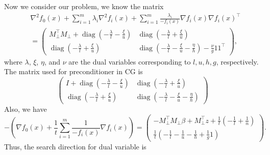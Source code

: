 \documentclass{article}
\begin{document}
Now we consider our problem, we know the matrix
\begin{equation}
    \begin{aligned}
        &\nabla^2 f_0(x)+\sum_{i=1}^m \lambda_i \nabla^2 f_i(x)+\sum_{i=1}^m \frac{\lambda_i}{-f_i(x)} \nabla f_i(x) \nabla f_i(x)^{\top}\\
        &=\left(\begin{array}{ll}
M_{\perp}^{\top} M_{\perp}+\operatorname{diag}\left(-\frac{\lambda}{l}-\frac{\xi}{u}\right) & \operatorname{diag}\left(-\frac{\lambda}{l}+\frac{\xi}{u}\right) \\
\operatorname{diag}\left(-\frac{\lambda}{l}+\frac{\xi}{u}\right) & \operatorname{diag}\left(-\frac{\lambda}{l}-\frac{\xi}{u}-\frac{\eta}{h}\right)-\frac{\nu}{g} 11^{\top}
\end{array}\right),
    \end{aligned}
\end{equation}
where $\lambda$, $\xi$, $\eta$, and $\nu$
 are the dual variables corresponding to $l, u, h, g$, respectively. The matrix used for preconditioner in CG is
 \begin{equation}
     \left(\begin{array}{ll}
I+\operatorname{diag}\left(-\frac{\lambda}{l}-\frac{\xi}{u}\right) & \operatorname{diag}\left(-\frac{\lambda}{l}+\frac{\xi}{u}\right) \\
\operatorname{diag}\left(-\frac{\lambda}{l}+\frac{\xi}{u}\right) & \operatorname{diag}\left(-\frac{\lambda}{l}-\frac{\xi}{u}-\frac{\eta}{h}\right)
\end{array}\right)
 \end{equation}
 Also, we have
 \begin{equation}
     -\left(\nabla f_0(x)+\frac{1}{t} \sum_{i=1}^m \frac{1}{-f_i(x)} \nabla f_i(x)\right)=\left(\begin{array}{c}
-M_{\perp}^{\top} M_{\perp} \beta+M_{\perp}^{\top} z+\frac{1}{t}\left(-\frac{1}{l}+\frac{1}{n}\right) \\
\frac{1}{t}\left(-\frac{1}{l}-\frac{1}{u}-\frac{1}{h}+\frac{1}{g} 1\right)
\end{array}\right).
 \end{equation}
 Thus, the search direction for dual variable is
\end{document}
